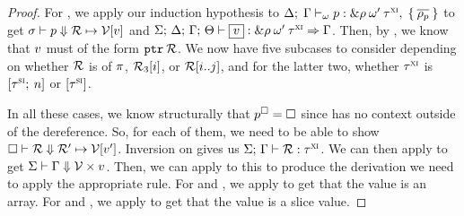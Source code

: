 \begin{proof}
  \vspace{1em}
  \noindent \framebox[\textwidth]{
    \figuresize
    \begin{mathpar}
      \TCDeref
    \end{mathpar}
  }
  \vspace{1em}

  For , we apply our induction hypothesis to 
  $ \Delta; \; \Gamma \vdash_{\omega} 
    p
   : 
    \& \rho \: \omega^\prime \: \tau^\textsc{xi}
  , \; \{ \: \overline{\rho_p} \: \} $ to get
  $ \sigma \vdash p \Downarrow \mathcal{R} \mapsto \mathcal{V} [v] $ and
  $\oxtypjudge{\oxglobalctx}{\oxtvarctx}{\oxkontctx}{\oxvarctx}{\oxvalue}
  {\oxtref{\oxprov}{\oxmuta^\prime}{\oxxitype}}{\oxvarctx}$. Then, by
  , we know that $v$ must of the form
  $\mathtt{ptr} \: \mathcal{R}$. We now have five subcases to consider depending on
  whether $\mathcal{R}$ is of $\pi$, $\mathcal{R}_3 [ i ]$, or
  $\mathcal{R} [ i .. j ]$, and for the latter two, whether $\tau^\textsc{xi}$ is
  $[\tau^\textsc{si} ; \: n]$ or $[\tau^\textsc{si}]$.

  \vspace{1em}
  \noindent \framebox[\textwidth]{
    \figuresize
    \begin{mathpar}
      \PDerefPtr \and \PDerefIndexPtrArray \and \PDerefIndexPtrSlice \and
      \PDerefSlicePtrArray \and \PDerefSlicePtrSlice
    \end{mathpar}
  }
  \vspace{1em}

  In all these cases, we know structurally that $p^\square = \square$
  since  has no context outside of the dereference. So, for
  each of them, we need to be able to show $ \square \vdash \mathcal{R} \Downarrow 
    \mathcal{R}^\prime
   \mapsto \mathcal{V} [v^\prime] $. Inversion on  gives us
  $\Sigma; \, \Gamma \vdash \mathcal{R} : \tau^\textsc{xi}$. We can
  then apply  to get
  $\Sigma \vdash \Gamma \Downarrow \mathcal{V} \times v$. Then, we
  can apply  to this to produce the derivation we need to
  apply the appropriate rule. For  and
  , we apply 
  to get that the value is an array. For  and
  , we apply  to get
  that the value is a slice value.
\end{proof}

